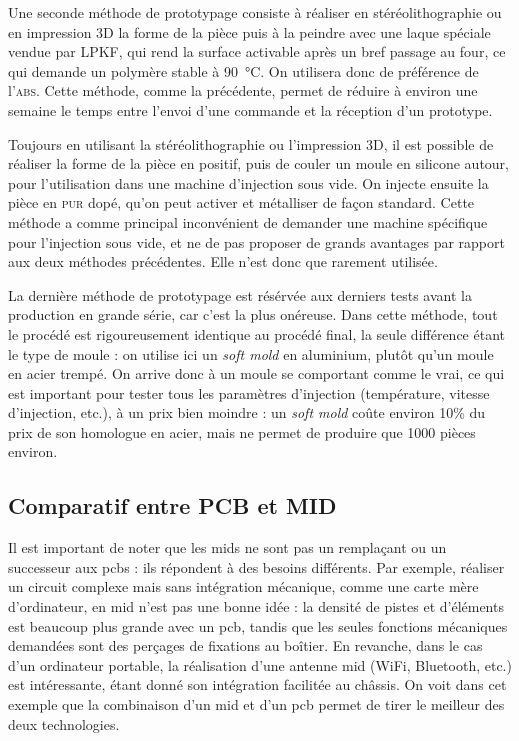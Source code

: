 Une seconde méthode de prototypage consiste à réaliser en stéréolithographie ou en impression 3D la forme de la pièce puis à la peindre avec une laque spéciale vendue par LPKF, qui rend la surface activable après un bref passage au four, ce qui demande un polymère stable à \SI{90}{\celsius}.
On utilisera donc de préférence de l'\textsc{abs}.
Cette méthode, comme la précédente, permet de réduire à environ une semaine le temps entre l'envoi d'une commande et la réception d'un prototype.

Toujours en utilisant la stéréolithographie ou l'impression 3D, il est possible de réaliser la forme de la pièce en positif, puis de couler un moule en silicone autour, pour l'utilisation dans une machine d'injection sous vide.
On injecte ensuite la pièce en \textsc{pur} dopé, qu'on peut activer et métalliser de façon standard.
Cette méthode a comme principal inconvénient de demander une machine spécifique pour l'injection sous vide, et ne de pas proposer de grands avantages par rapport aux deux méthodes précédentes.
Elle n'est donc que rarement utilisée.

La dernière méthode de prototypage est résérvée aux derniers tests avant la production en grande série, car c'est la plus onéreuse.
Dans cette méthode, tout le procédé est rigoureusement identique au procédé final, la seule différence étant le type de moule : on utilise ici un \textit{soft mold} en aluminium, plutôt qu'un moule en acier trempé.
On arrive donc à un moule se comportant comme le vrai, ce qui est important pour tester tous les paramètres d'injection (température, vitesse d'injection, etc.), à un prix bien moindre : un \textit{soft mold} coûte environ 10\% du prix de son homologue en acier, mais ne permet de produire que 1000 pièces environ.
\subsection{Comparatif entre PCB et MID}
Il est important de noter que les \glspl{mid} ne sont pas un remplaçant ou un successeur aux \glspl{pcb} : ils répondent à des besoins différents.
Par exemple, réaliser un circuit complexe mais sans intégration mécanique, comme une carte mère d'ordinateur, en \gls{mid} n'est pas une bonne idée : la densité de pistes et d'éléments est beaucoup plus grande avec un \gls{pcb}, tandis que les seules fonctions mécaniques demandées sont des perçages de fixations au boîtier.
En revanche, dans le cas d'un ordinateur portable, la réalisation d'une antenne \gls{mid} (WiFi, Bluetooth, etc.) est intéressante, étant donné son intégration facilitée au châssis.
On voit dans cet exemple que la combinaison d'un \gls{mid} et d'un \gls{pcb} permet de tirer le meilleur des deux technologies.

